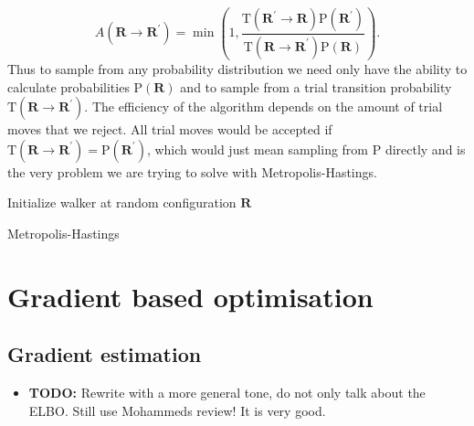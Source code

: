 \begin{equation}
A\left(\mathbf{R} \rightarrow \mathbf{R}^{\prime}\right)=\min \left(1, \frac{\mathrm{T}\left(\mathbf{R}^{\prime} \rightarrow \mathbf{R}\right) \mathrm{P}\left(\mathbf{R}^{\prime}\right)}{\mathrm{T}\left(\mathbf{R} \rightarrow \mathbf{R}^{\prime}\right) \mathrm{P}(\mathbf{R})}\right).
\end{equation}
Thus to sample from any probability distribution we need only have the ability to calculate probabilities $\mathrm P(\mathbf{R})$ and to sample from a trial transition probability $\mathrm T(\mathbf{R} \rightarrow \mathbf{R}^{\prime})$. The efficiency of the algorithm depends on the amount of trial moves that we reject. All trial moves would be accepted if $\mathrm{T}(\mathbf{R} \rightarrow \mathbf{R}^{\prime})= \mathrm{P}(\mathbf{R}^\prime)$, which would just mean sampling from $\mathrm P$ directly and is the very problem we are trying to solve with Metropolis-Hastings. 	
\begin{algorithm}
	\label{alg:MCMC}
	\SetAlgoLined
	Initialize walker at random configuration $\mathbf{R}$\;
	\caption{Metropolis-Hastings}
\end{algorithm}

\section{Gradient based optimisation}
\label{sec:gbopt}

\subsection{Gradient estimation}
\label{subsec:gbopt-gest}

\begin{itemize}
	\item \textbf{TODO:} Rewrite with a more general tone, do not only talk about the ELBO. Still use Mohammeds review! It is very good.
\end{itemize}

